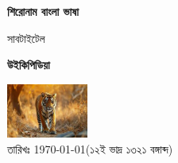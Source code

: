 \documentclass{article}
\begin{document}
\begin{titlepage}
   \begin{center}
       \vspace*{1cm}

       \textbf{শিরোনাম বাংলা ভাষা}

       \vspace{0.5cm}
        সাবটাইটেল
            
       \vspace{1.0cm}

       \textbf{উইকিপিডিয়া}%

       \vfill
       \vspace{0.2cm}     
       \includegraphics[width=0.2\textwidth]{figs/sample.jpg} \\
       তারিখঃ \today (১২ই ভাদ্র ১৩২১ বঙ্গাব্দ)
            
   \end{center}
\end{titlepage}
\tableofcontents
\newpage


 

\end{document}
